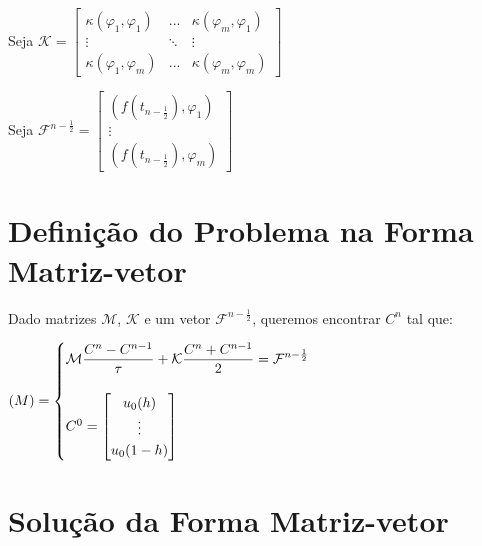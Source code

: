   Seja $\displaystyle \mathcal{K} = \begin{bmatrix} \kappa(\varphi_1, \varphi_1) & ... & \kappa(\varphi_m, \varphi_1) \\ \vdots & \ddots & \vdots \\ \kappa(\varphi_1, \varphi_m) & ... & \kappa(\varphi_m, \varphi_m) \end{bmatrix}$

  Seja $\displaystyle \mathcal{F}^{n-\frac{1}{2}} = \begin{bmatrix} (f(t_{n - \frac{1}{2}}), \varphi_1) \\ \vdots \\ (f(t_{n - \frac{1}{2}}), \varphi_m) \end{bmatrix}$

\section{Definição do Problema na Forma Matriz-vetor}

  Dado matrizes $\mathcal{M}$, $\mathcal{K}$ e um vetor $\mathcal{F}^{n-\frac{1}{2}}$, queremos encontrar $C^n$ tal que:

  $(M) = \begin{cases}
      \mathcal{M} \displaystyle\dfrac{C^n - C^{n-1}}{\tau} + \mathcal{K} \displaystyle\dfrac{C^n + C^{n-1}}{2} = \mathcal{F}^{n - \frac{1}{2}}\\
      \vphantom{buffer} \\
      C^0 = \begin{bmatrix}
      u_0(h) \\
      \vdots \\
      u_0(1 - h)
      \end{bmatrix}
  \end{cases}$

\section{Solução da Forma Matriz-vetor}

